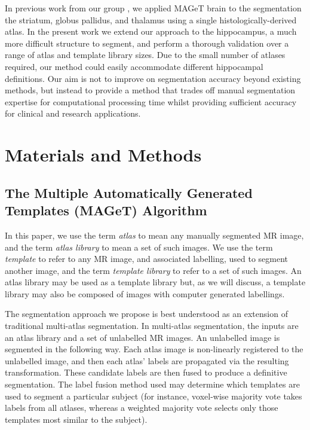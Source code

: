\documentclass{article}
\newcommand{\magetbrain}{MAGeT brain }
\begin{document}
In previous work from our group \cite{Chakravarty2011}, we applied \magetbrain
to the segmentation the striatum, globus pallidus, and thalamus using a single
histologically-derived atlas. In the present work we extend our approach to the
hippocampus, a much more difficult structure to segment, and perform a thorough
validation over a range of atlas and template library sizes. Due to the small
number of atlases required, our method could easily accommodate different
hippocampal definitions. Our aim is not to improve on segmentation accuracy
beyond existing methods, but instead to provide a method that trades off manual
segmentation expertise for computational processing time whilst providing
sufficient accuracy for clinical and research applications.


\section{Materials and Methods} 
\subsection{The Multiple Automatically Generated Templates (MAGeT) Algorithm}

In this paper, we use the term {\it atlas} to mean any manually segmented MR
image, and the term {\it atlas library} to mean a set of such images.  We use
the term {\it template} to refer to any MR image, and associated labelling,
used to segment another image, and the term {\it template library} to refer to
a set of such images.  An atlas library may be used as a template library but,
as we will discuss, a template library may also be composed of images with
computer generated labellings. 

The segmentation approach we propose is best understood as an extension of
traditional multi-atlas segmentation.  In multi-atlas segmentation, the inputs
are an atlas library and a set of unlabelled MR images.  An unlabelled image is
segmented in the following way.  Each atlas image is non-linearly registered to
the unlabelled image, and then each atlas' labels are propagated via the
resulting transformation.  These candidate labels are then fused to produce a
definitive segmentation. The label fusion method used may determine which
templates are used to segment a particular subject (for instance, voxel-wise
majority vote takes labels from all atlases, whereas a weighted majority vote
selects only those templates most similar to the subject). 
\end{document}
